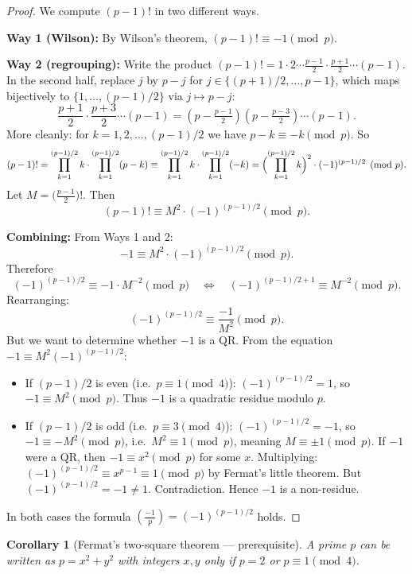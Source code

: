 \documentclass[12pt,a4paper]{amsart}
\newtheorem{corollary}[theorem]{Corollary}
\theoremstyle{definition}
\newcommand{\leg}[2]{\left(\frac{#1}{#2}\right)}
\begin{document}
\begin{proof}
  We compute $(p-1)!$ in two different ways.

  \textbf{Way 1 (Wilson):}
  By Wilson's theorem, $(p-1)! \equiv -1 \pmod p$.

  \textbf{Way 2 (regrouping):}
  Write the product $(p-1)! = 1 \cdot 2 \cdots \frac{p-1}{2} \cdot \frac{p+1}{2}
  \cdots (p-1)$.  In the second half, replace $j$ by $p - j$ for
  $j \in \{(p+1)/2, \ldots, p-1\}$, which maps bijectively to
  $\{1, \ldots, (p-1)/2\}$ via $j \mapsto p-j$:
  \[
    \frac{p+1}{2} \cdot \frac{p+3}{2} \cdots (p-1)
    = (p - \tfrac{p-1}{2})(p - \tfrac{p-3}{2}) \cdots (p-1).
  \]
  More cleanly: for $k = 1, 2, \ldots, (p-1)/2$ we have
  $p - k \equiv -k \pmod p$.  So
  \[
    (p-1)! = \prod_{k=1}^{(p-1)/2} k \cdot \prod_{k=1}^{(p-1)/2}(p-k)
    \equiv \prod_{k=1}^{(p-1)/2} k \cdot \prod_{k=1}^{(p-1)/2}(-k)
    = \Bigl(\prod_{k=1}^{(p-1)/2} k\Bigr)^2 \cdot (-1)^{(p-1)/2} \pmod p.
  \]
  Let $M = \bigl(\tfrac{p-1}{2}\bigr)!$.  Then
  \[
    (p-1)! \equiv M^2 \cdot (-1)^{(p-1)/2} \pmod p.
  \]

  \textbf{Combining:}
  From Ways 1 and 2:
  \[
    -1 \equiv M^2 \cdot (-1)^{(p-1)/2} \pmod p.
  \]
  Therefore
  \[
    (-1)^{(p-1)/2} \equiv -1 \cdot M^{-2} \pmod p
    \quad\Longleftrightarrow\quad
    (-1)^{(p-1)/2+1} \equiv M^{-2} \pmod p.
  \]
  Rearranging:
  \[
    (-1)^{(p-1)/2} \equiv \frac{-1}{M^2} \pmod p.
  \]
  But we want to determine whether $-1$ is a QR.  From the equation
  $-1 \equiv M^2 (-1)^{(p-1)/2}$:
  \begin{itemize}
    \item If $(p-1)/2$ is even (i.e.\ $p \equiv 1 \pmod 4$):
      $(-1)^{(p-1)/2} = 1$, so $-1 \equiv M^2 \pmod p$.
      Thus $-1$ is a quadratic residue modulo $p$. \checkmark
    \item If $(p-1)/2$ is odd (i.e.\ $p \equiv 3 \pmod 4$):
      $(-1)^{(p-1)/2} = -1$, so $-1 \equiv -M^2 \pmod p$,
      i.e.\ $M^2 \equiv 1 \pmod p$, meaning $M \equiv \pm 1 \pmod p$.
      If $-1$ were a QR, then $-1 \equiv x^2 \pmod p$ for some $x$.
      Multiplying: $(-1)^{(p-1)/2} \equiv x^{p-1} \equiv 1 \pmod p$ by
      Fermat's little theorem.  But $(-1)^{(p-1)/2} = -1 \neq 1$. Contradiction.
      Hence $-1$ is a non-residue. \checkmark
  \end{itemize}
  In both cases the formula $\leg{-1}{p} = (-1)^{(p-1)/2}$ holds.
\end{proof}

\begin{corollary}[Fermat's two-square theorem — prerequisite]\label{cor:twosquares}
  A prime $p$ can be written as $p = x^2 + y^2$ with integers $x, y$ only
  if $p = 2$ or $p \equiv 1 \pmod 4$.
\end{corollary}
\end{document}

